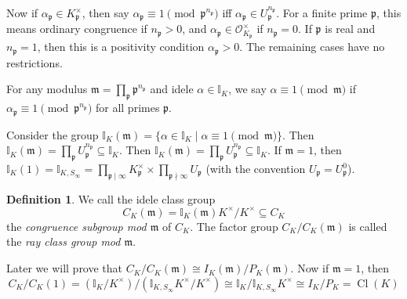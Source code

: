 \documentclass[11pt]{article}
\theoremstyle{definition}
\newtheorem{definition}{Definition}[section]
\theoremstyle{plain}
\theoremstyle{remark}
\DeclareMathOperator{\Cl}{Cl}
\newcommand{\II}{\mathbb{I}}
\newcommand{\cO}{\mathcal{O}}
\newcommand{\fp}{\mathfrak{p}}
\newcommand{\fm}{\mathfrak{m}}
\begin{document}
Now if $\alpha_\fp \in K_\fp^\times$, then say $\alpha_\fp \equiv 1 \pmod{\fp^{n_\fp}}$ iff $\alpha_\fp \in U_\fp^{n_\fp}$. For a finite prime $\fp$, this means ordinary congruence if $n_\fp > 0$, and $\alpha_\fp \in \cO_{K_\fp}^\times$ if $n_\fp = 0$. If $\fp$ is real and $n_\fp = 1$, then this is a positivity condition $\alpha_\fp > 0$. The remaining cases have no restrictions.

For any modulus $\fm = \prod_\fp \fp^{n_\fp}$ and idele $\alpha \in \II_K$, we say $\alpha \equiv 1 \pmod{\fm}$ if $\alpha_\fp \equiv 1 \pmod{\fp^{n_\fp}}$ for all primes $\fp$.

Consider the group $\II_K(\fm) = \{\alpha \in \II_K \mid \alpha \equiv 1 \pmod{\fm}\}$. Then $\II_K(\fm) = \prod_{\fp} U_\fp^{n_\fp} \subseteq \II_K$. Then $\II_K(\fm) = \prod_\fp U_\fp^{n_\fp} \subseteq \II_K$. If $\fm = 1$, then $\II_K(1) = \II_{K,S_\infty} = \prod_{\fp \mid \infty} K_\fp^\times \times \prod_{\fp \nmid \infty} U_\fp$ (with the convention $U_\fp = U_\fp^0$).

\begin{definition}\label{def:9_16}
    We call the idele class group
    \begin{equation*}
        C_K(\fm) = \II_K(\fm) K^\times / K^\times \subseteq C_K
    \end{equation*}
    the \emph{congruence subgroup mod $\fm$} of $C_K$. The factor group $C_K / C_K(\fm)$ is called the \emph{ray class group mod $\fm$}.
\end{definition}

Later we will prove that $C_K / C_K(\fm) \cong I_K(\fm) / P_K(\fm)$. Now if $\fm = 1$, then
\begin{equation*}
    C_K / C_K(1) = (\II_K / K^\times) / (\II_{K, S_\infty} K^\times / K^\times) \cong \II_K / \II_{K, S_\infty} K^\times \cong I_K / P_K = \Cl(K)
\end{equation*}
\end{document}
